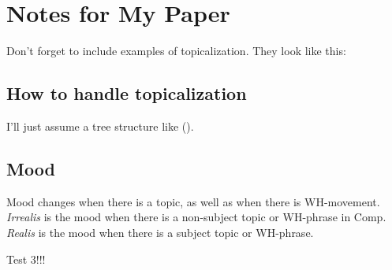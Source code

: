\documentclass[12pt]{article}
\begin{document}
\section*{Notes for My Paper}

Don't forget to include examples of topicalization.
They look like this:

{\small
{}
}

\subsection*{How to handle topicalization}

I'll just assume a tree structure like ().

{\small
{}
}

\subsection*{Mood}

Mood changes when there is a topic, as well as when
there is WH-movement.  \emph{Irrealis} is the mood when
there is a non-subject topic or WH-phrase in Comp.
\emph{Realis} is the mood when there is a subject topic
or WH-phrase.

Test 3!!!
\end{document}
